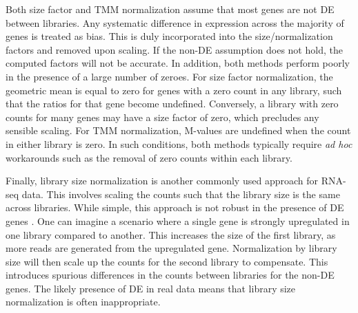 \documentclass{article}
\begin{document}
Both size factor and TMM normalization assume that most genes are not DE between libraries.
Any systematic difference in expression across the majority of genes is treated as bias.
This is duly incorporated into the size/normalization factors and removed upon scaling.
If the non-DE assumption does not hold, the computed factors will not be accurate.
In addition, both methods perform poorly in the presence of a large number of zeroes.
For size factor normalization, the geometric mean is equal to zero for genes with a zero count in any library, such that the ratios for that gene become undefined.
Conversely, a library with zero counts for many genes may have a size factor of zero, which precludes any sensible scaling.
For TMM normalization, M-values are undefined when the count in either library is zero.
In such conditions, both methods typically require \textit{ad hoc} workarounds such as the removal of zero counts within each library.

Finally, library size normalization is another commonly used approach for RNA-seq data.
This involves scaling the counts such that the library size is the same across libraries.
While simple, this approach is not robust in the presence of DE genes \cite{robinson2010scaling}.
One can imagine a scenario where a single gene is strongly upregulated in one library compared to another.
This increases the size of the first library, as more reads are generated from the upregulated gene.
Normalization by library size will then scale up the counts for the second library to compensate.
This introduces spurious differences in the counts between libraries for the non-DE genes.
The likely presence of DE in real data means that library size normalization is often inappropriate.
\end{document}
